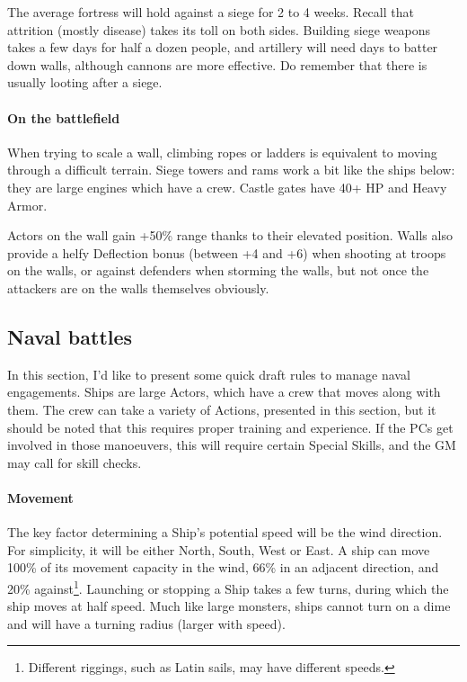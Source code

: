 The average fortress will hold against a siege for 2 to 4 weeks. Recall that attrition (mostly disease) takes its toll on both sides. Building siege weapons takes a few days for half a dozen people, and artillery will need days to batter down walls, although cannons are more effective. Do remember that there is usually looting after a siege.


\paragraph{On the battlefield}

When trying to scale a wall, climbing ropes or ladders is equivalent to moving through a difficult terrain. Siege towers and rams work a bit like the ships below: they are large engines which have a crew. Castle gates have 40+ HP and Heavy Armor.

Actors on the wall gain +50\% range thanks to their elevated position. Walls also provide a helfy Deflection bonus (between +4 and +6) when shooting at troops on the walls, or against defenders when storming the walls, but not once the attackers are on the walls themselves obviously.


\subsection{Naval battles}

In this section, I'd like to present some quick draft rules to manage naval engagements. Ships are large Actors, which have a crew that moves along with them. The crew can take a variety of Actions, presented in this section, but it should be noted that this requires proper training and experience. If the PCs get involved in those manoeuvers, this will require certain Special Skills, and the GM may call for skill checks.

\paragraph{Movement}

The key factor determining a Ship's potential speed will be the wind direction. For simplicity, it will be either North, South, West or East. A ship can move 100\% of its movement capacity in the wind, 66\% in an adjacent direction, and 20\% against\footnote{Different riggings, such as Latin sails, may have different speeds.}. Launching or stopping a Ship takes a few turns, during which the ship moves at half speed. Much like large monsters, ships cannot turn on a dime and will have a turning radius (larger with speed).

